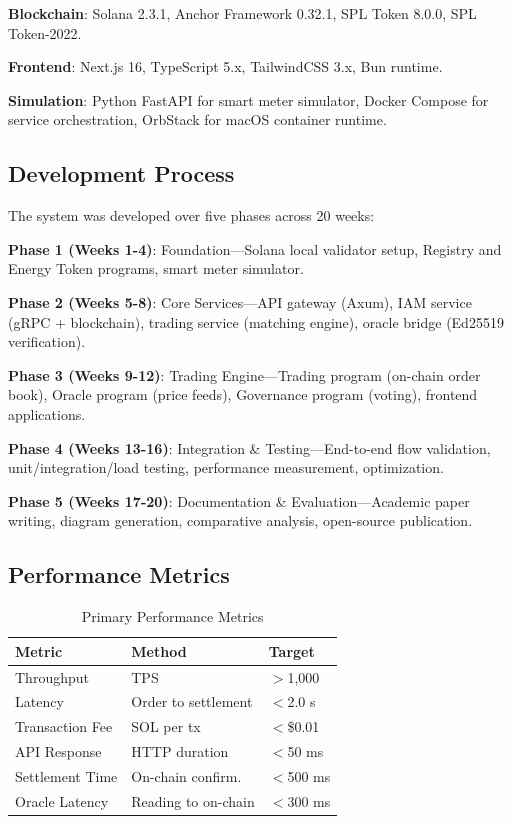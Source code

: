 \documentclass[conference]{IEEEtran}
\begin{document}
\textbf{Blockchain}: Solana 2.3.1, Anchor Framework 0.32.1, SPL Token 8.0.0, SPL Token-2022.

\textbf{Frontend}: Next.js 16, TypeScript 5.x, TailwindCSS 3.x, Bun runtime.

\textbf{Simulation}: Python FastAPI for smart meter simulator, Docker Compose for service orchestration, OrbStack for macOS container runtime.

\subsection{Development Process}

The system was developed over five phases across 20 weeks:

\textbf{Phase 1 (Weeks 1-4)}: Foundation---Solana local validator setup, Registry and Energy Token programs, smart meter simulator.

\textbf{Phase 2 (Weeks 5-8)}: Core Services---API gateway (Axum), IAM service (gRPC + blockchain), trading service (matching engine), oracle bridge (Ed25519 verification).

\textbf{Phase 3 (Weeks 9-12)}: Trading Engine---Trading program (on-chain order book), Oracle program (price feeds), Governance program (voting), frontend applications.

\textbf{Phase 4 (Weeks 13-16)}: Integration \& Testing---End-to-end flow validation, unit/integration/load testing, performance measurement, optimization.

\textbf{Phase 5 (Weeks 17-20)}: Documentation \& Evaluation---Academic paper writing, diagram generation, comparative analysis, open-source publication.

\subsection{Performance Metrics}

\begin{table}[htbp]
\caption{Primary Performance Metrics}
\begin{center}
\begin{tabular}{l l l}
\toprule
\textbf{Metric} & \textbf{Method} & \textbf{Target} \\
\midrule
Throughput & TPS & $>$1,000 \\
Latency & Order to settlement & $<$2.0 s \\
Transaction Fee & SOL per tx & $<$\$0.01 \\
API Response & HTTP duration & $<$50 ms \\
Settlement Time & On-chain confirm. & $<$500 ms \\
Oracle Latency & Reading to on-chain & $<$300 ms \\
\bottomrule
\end{tabular}
\label{tab:metrics}
\end{center}
\end{table}
\end{document}
